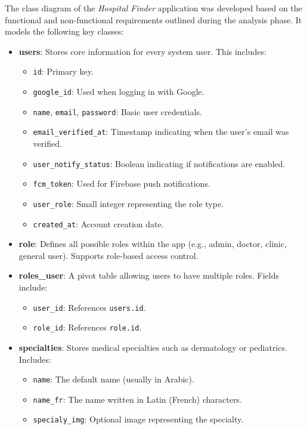 \documentclass[12pt]{report}
\begin{document}
The class diagram of the \textit{Hospital Finder} application was developed based on the functional and non-functional requirements outlined during the analysis phase. It models the following key classes:

\begin{itemize}

	\item \textbf{users}: Stores core information for every system user. This includes:
	\begin{itemize}
		\item \texttt{id}: Primary key.
		\item \texttt{google\_id}: Used when logging in with Google.
		\item \texttt{name}, \texttt{email}, \texttt{password}: Basic user credentials.
		\item \texttt{email\_verified\_at}: Timestamp indicating when the user's email was verified.
		\item \texttt{user\_notify\_status}: Boolean indicating if notifications are enabled.
		\item \texttt{fcm\_token}: Used for Firebase push notifications.
		\item \texttt{user\_role}: Small integer representing the role type.
		\item \texttt{created\_at}: Account creation date.
	\end{itemize}

	\item \textbf{role}: Defines all possible roles within the app (e.g., admin, doctor, clinic, general user). Supports role-based access control.

	\item \textbf{roles\_user}: A pivot table allowing users to have multiple roles. Fields include:
	\begin{itemize}
		\item \texttt{user\_id}: References \texttt{users.id}.
		\item \texttt{role\_id}: References \texttt{role.id}.
	\end{itemize}

	\item \textbf{specialties}: Stores medical specialties such as dermatology or pediatrics. Includes:
	\begin{itemize}
		\item \texttt{name}: The default name (usually in Arabic).
		\item \texttt{name\_fr}: The name written in Latin (French) characters.
		\item \texttt{specialy\_img}: Optional image representing the specialty.
	\end{itemize}


\end{itemize}
\end{document}
